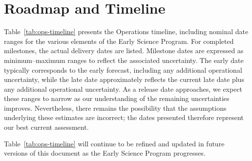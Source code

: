 \section{Roadmap and Timeline} \label{sec:timeline}

Table~\ref{tab:ops-timeline} presents the Operations timeline, including nominal date ranges for the various elements of the Early Science Program.
For completed milestones, the actual delivery dates are listed.
Milestone dates are expressed as minimum–maximum ranges to reflect the associated uncertainty.
The early date typically corresponds to the early  forecast, including any additional operational uncertainty, while the late date approximately reflects the current  late date plus any additional operational uncertainty. 
As a release date approaches, we expect these ranges to narrow as our understanding of the remaining uncertainties improves.
Nevertheless, there remains the possibility that the assumptions underlying these estimates are incorrect; the dates presented therefore represent our best current assessment.



Table~\ref{tab:ops-timeline} will continue to be refined and updated in future versions of this document as the Early Science Program progresses.
